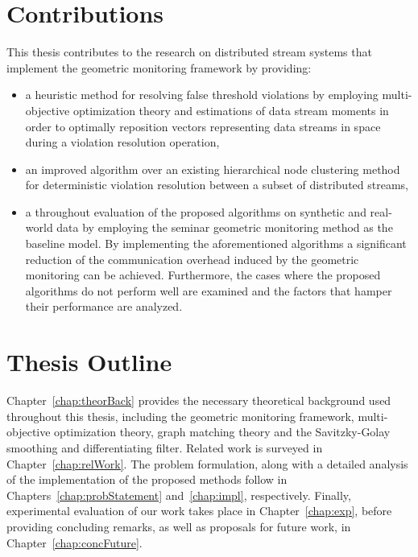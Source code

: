 \section{Contributions} \label{sec:intro-contr}

This thesis contributes to the research on distributed stream systems that implement the geometric monitoring framework by providing:
\begin{itemize}
\item a heuristic method for resolving false threshold violations by employing multi-objective optimization theory and estimations of data stream moments in order to optimally reposition vectors representing data streams in space during a violation resolution operation,
\item an improved algorithm over an existing hierarchical node clustering method for deterministic violation resolution between a subset of distributed streams,
\item a throughout evaluation of the proposed algorithms on synthetic and real-world data by employing the seminar geometric monitoring method as the baseline model. By implementing the aforementioned algorithms a significant reduction of the communication overhead induced by the geometric monitoring can be achieved. Furthermore, the cases where the proposed algorithms do not perform well are examined and the factors that hamper their performance are analyzed.
\end{itemize}

\section{Thesis Outline} \label{sec:intro-thesisOutline}

Chapter~\ref{chap:theorBack} provides the necessary theoretical background used throughout this thesis, including the geometric monitoring framework, multi-objective optimization theory, graph matching theory and the Savitzky-Golay smoothing and differentiating filter. Related work is surveyed in Chapter~\ref{chap:relWork}. The problem formulation, along with a detailed analysis of the implementation of the proposed methods follow in Chapters~\ref{chap:probStatement} and~\ref{chap:impl}, respectively. Finally, experimental evaluation of our work takes place in Chapter~\ref{chap:exp}, before providing concluding remarks, as well as proposals for future work, in Chapter~\ref{chap:concFuture}.